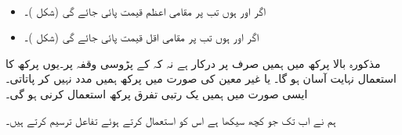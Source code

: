 \\
\begin{itemize}
\item
اگر  اور  ہوں تب  پر مقامی اعظم قیمت پائی جائے گی (شکل )۔
\item
اگر  اور  ہوں تب  پر مقامی اقل قیمت پائی جائے گی (شکل )۔
\end{itemize}

مذکورہ بالا پرکھ میں ہمیں صرف  پر  درکار ہے نہ  کہ  کے پڑوسی وقفہ پر۔یوں پرکھ کا استعمال نہایت آسان ہو گا۔   یا غیر معین  کی صورت میں پرکھ ہمیں مدد نہیں کر پاتاتی۔ایسی صورت میں ہمیں یک رتبی تفرق پرکھ استعمال کرنی ہو گی۔

ہم نے اب تک جو کچھ سیکھا ہے اس کو استعمال کرتے ہوئے تفاعل ترسیم کرتے ہیں۔

